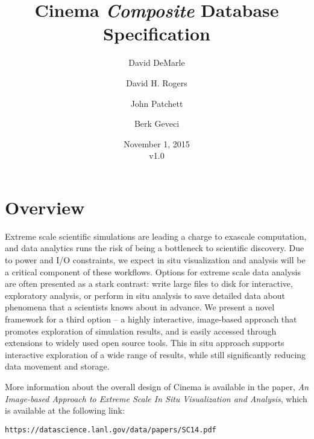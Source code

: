 \documentclass{article}
\newcommand{\CinemaSpecVersion} {v1.0}
\newcommand{\Composite} {\textit{Composite}\xspace}
\begin{document}
\title{Cinema \Composite Database Specification}
\date{November 1, 2015 \\ \CinemaSpecVersion}
\author[**]{David DeMarle}
\author[*]{David H. Rogers}
\author[*]{John Patchett}
\author[**]{Berk Geveci}

\renewcommand\Authands{ and }



\maketitle
{}


\section{Overview}
Extreme scale scientific simulations are leading a charge to exascale computation, and data analytics runs the risk of being a bottleneck to scientific discovery. Due to power and I/O constraints, we expect in situ visualization and analysis will be a critical component of these workflows. Options for extreme scale data analysis are often presented as a stark contrast: write large files to disk for interactive, exploratory analysis, or perform in situ analysis to save detailed data about phenomena that a scientists knows about in advance. We present a novel framework for a third option – a highly interactive, image-based approach that promotes exploration of simulation results, and is easily accessed through extensions to widely used open source tools. This in situ approach supports interactive exploration of a wide range of results, while still significantly reducing data movement and storage.

More information about the overall design of Cinema is available in the paper, \textit{An Image-based Approach to Extreme Scale In Situ Visualization and Analysis}\cite{cinemaSC14}, which is available at the following link:

\begin{center}
\texttt{https://datascience.lanl.gov/data/papers/SC14.pdf}
\end{center}
\end{document}
